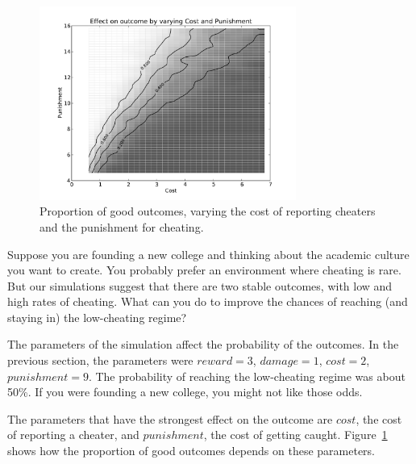 \documentclass[10pt]{book}
\begin{document}
\begin{figure}
  \begin{center}
    \includegraphics[width=0.75\textwidth]{figs/varyCP_09.pdf}
  \end{center}
  \caption{Proportion of good outcomes, varying the cost of reporting cheaters and the punishment for cheating.}\label{fig.varyCP}
\end{figure}

Suppose you are founding a new college and thinking about the academic
culture you want to create.  You probably prefer an
environment where cheating is rare.  But our simulations suggest that
there are two stable outcomes, with low and high rates of cheating.
What can you do to improve the chances of reaching (and staying in)
the low-cheating regime?

The parameters of the simulation affect the probability of the
outcomes.  In the previous section, the parameters were $reward = 3$,
$damage = 1$, $cost = 2$, $punishment = 9$.  The probability of
reaching the low-cheating regime was about 50\%.  If you were
founding a new college, you might not like those odds.

The parameters that have the strongest effect on the outcome are
$cost$, the cost of reporting a cheater, and $punishment$, the cost
of getting caught.  Figure~\ref{fig.varyCP}
shows how the proportion of good outcomes depends on these parameters.

\end{document}
